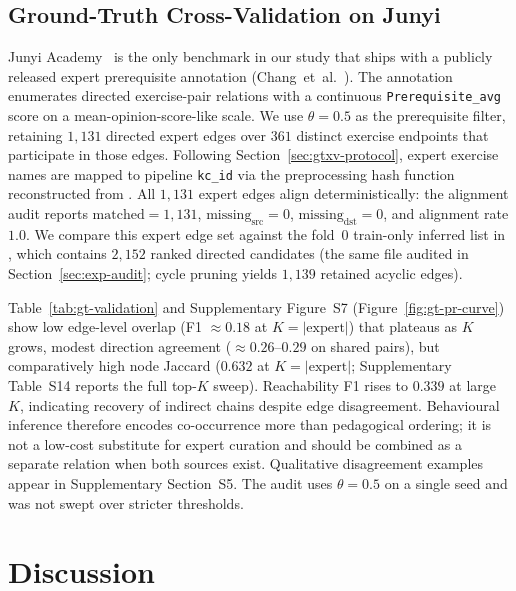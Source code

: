 \documentclass[pdflatex,sn-mathphys-num]{sn-jnl}
\begin{document}
\subsection{Ground-Truth Cross-Validation on Junyi}
\label{sec:exp-gtxv}
Junyi Academy~\cite{junyi_dataset} is the only benchmark in our study
that ships with a publicly released expert prerequisite annotation
(Chang~et~al.~\cite{chang2015junyi}). The annotation enumerates directed exercise-pair
relations with a continuous \texttt{Prerequisite\_avg} score on a
mean-opinion-score-like scale. We use $\theta=0.5$ as the prerequisite
filter, retaining $1{,}131$ directed expert edges over $361$ distinct
exercise endpoints that participate in those edges. Following Section~\ref{sec:gtxv-protocol}, expert
exercise names are mapped to pipeline \texttt{kc\_id} via the
preprocessing hash function reconstructed from
. All $1{,}131$ expert
edges align deterministically: the alignment audit reports
$\text{matched}=1{,}131$, $\text{missing}_{\text{src}}=0$,
$\text{missing}_{\text{dst}}=0$, and alignment rate $1.0$. We compare
this expert edge set against the fold~0 train-only inferred list in
, which contains $2{,}152$ ranked directed
candidates (the same file audited in Section~\ref{sec:exp-audit}; cycle
pruning yields $1{,}139$ retained acyclic edges).



Table~\ref{tab:gt-validation} and Supplementary Figure~S7
(Figure~\ref{fig:gt-pr-curve}) show low edge-level overlap (F1 $\approx 0.18$ at
$K{=}|\text{expert}|$) that plateaus as $K$ grows, modest direction agreement
($\approx 0.26$--$0.29$ on shared pairs), but comparatively high node Jaccard
($0.632$ at $K{=}|\text{expert}|$; Supplementary Table~S14 reports the full
top-$K$ sweep). Reachability F1 rises to $0.339$ at large $K$, indicating
recovery of indirect chains despite edge disagreement. Behavioural inference
therefore encodes co-occurrence more than pedagogical ordering; it is not a
low-cost substitute for expert curation and should be combined as a separate
relation when both sources exist. Qualitative disagreement examples appear in
Supplementary Section~S5. The audit uses $\theta{=}0.5$ on a single seed and
was not swept over stricter thresholds.
\section{Discussion}
\label{sec:disc}
\end{document}
